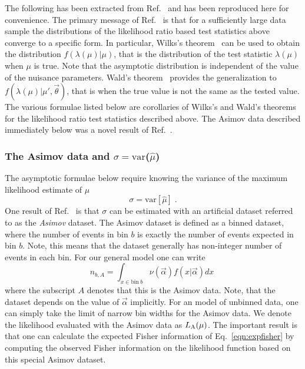 The following has been extracted from Ref.~\cite{asimov} and has been reproduced here for convenience.  The primary message of Ref.~\cite{asimov} is that for a sufficiently large data sample the distributions of the likelihood ratio based test statistics above converge to a specific form.  In particular, Wilks's theorem~\cite{Wilks} can be used to obtain the distribution $f(\lambda(\mu)|\mu)$, that is the distribution of the test statistic $\lambda(\mu)$ when $\mu$ is true.  Note that the asymptotic distribution is independent of the value of the nuisance parameters. Wald's theorem~\cite{Wald} provides the generalization to $f(\lambda(\mu)|\mu',\vec\theta)$, that is when the true value is not the same as the tested value.  The various formulae listed below are corollaries of Wilks's and Wald's theorems for the likelihood ratio test statistics described above.  The Asimov data described immediately below was a novel result of Ref.~\cite{asimov}.


\subsubsection{The Asimov data and  $\sigma=\textrm{var}$($\hat\mu$)}
\label{S:Asimov} 

The asymptotic formulae below require knowing the variance of the maximum likelihood estimate of $\mu$
\begin{equation}
 \sigma=\textrm{var}[\hat\mu]\;.
 \end{equation}
One result of Ref.~\cite{asimov} is that $\sigma$ can be
estimated with an artificial dataset referred to as the \textit{ Asimov} dataset.  The Asimov dataset is defined as a binned dataset, where the number of events in bin $b$ is exactly the number of events expected in bin $b$.  Note, this means that the dataset generally has non-integer number of events in each bin.  For our general model one can write
\begin{equation}
\label{eqn:asimovData}
n_{b,A} = \int_{x \in \textrm{bin}~b} \nu(\vec\alpha) f(x|\vec\alpha) dx \;
\end{equation}
where the subscript $A$ denotes that this is the Asimov data.  Note, that the dataset depends on the value of $\vec\alpha$ implicitly.  For an model of unbinned data, one can simply take the limit of narrow bin widths for the Asimov data.    We denote the likelihood evaluated with the Asimov data as $L_{\rm A}(\mu)$. 
The important result is that one can calculate the expected Fisher information of Eq.~\ref{eqn:expfisher} by computing the observed Fisher information on the likelihood function based on this special Asimov dataset.  


